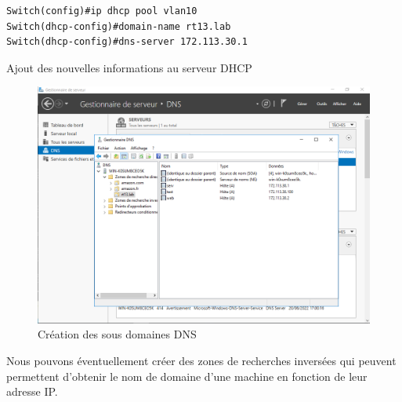 \documentclass{article}
\begin{document}
\begin{listing}[H]
    \begin{verbatim}
Switch(config)#ip dhcp pool vlan10
Switch(dhcp-config)#domain-name rt13.lab
Switch(dhcp-config)#dns-server 172.113.30.1
    \end{verbatim}
    \caption{Ajout des nouvelles informations au serveur DHCP}
    \label{switch:dns-dhcp}
\end{listing}
\begin{figure}[H]
    \begin{center}
        \includegraphics[scale=0.55]{fig/dns-config.png}
    \end{center}
    \caption{Création des sous domaines DNS}
    \label{serv:dns2}
\end{figure}
Nous pouvons éventuellement créer des zones de recherches inversées qui peuvent permettent d'obtenir le nom de domaine d'une machine en fonction de leur adresse IP.
\end{document}
